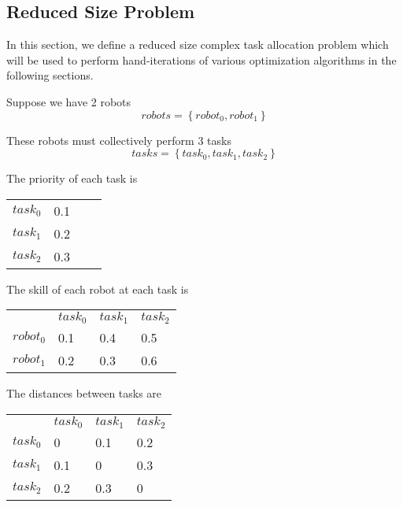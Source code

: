 \documentclass[a4paper]{article}
\begin{document}
\subsection{Reduced Size Problem}



In this section, we define a reduced size complex task allocation problem which
will be used to perform hand-iterations of various optimization algorithms in
the following sections.

Suppose we have 2 robots
$$\mathit{robots} = \left\{ \mathit{robot}_0, \mathit{robot}_1 \right\}$$

These robots must collectively perform 3 tasks
$$\mathit{tasks} = \left\{ \mathit{task}_0, \mathit{task}_1,  \mathit{task}_2 \right\}$$

The priority of each task is

\begin{tabular}{llll}
$\mathit{task}_0$  & 0.1 \\
$\mathit{task}_1$  & 0.2 \\
$\mathit{task}_2$  & 0.3 \\
\end{tabular}
\vspace{1.5em}

The skill of each robot  at each task is

\begin{tabular}{llll}
                   & $\mathit{task}_0$ & $\mathit{task}_1$ & $\mathit{task}_2$ \\
$\mathit{robot}_0$ & 0.1               & 0.4               & 0.5               \\
$\mathit{robot}_1$ & 0.2               & 0.3               & 0.6               \\
\end{tabular}
\vspace{1.5em}

The distances between tasks are

\begin{tabular}{llll}
                   & $\mathit{task}_0$ & $\mathit{task}_1$ & $\mathit{task}_2$ \\
$\mathit{task}_0$  & 0                 & 0.1               & 0.2               \\
$\mathit{task}_1$  & 0.1               & 0                 & 0.3               \\
$\mathit{task}_2$  & 0.2               & 0.3               & 0                 \\
\end{tabular}
\vspace{1.5em}
\end{document}
